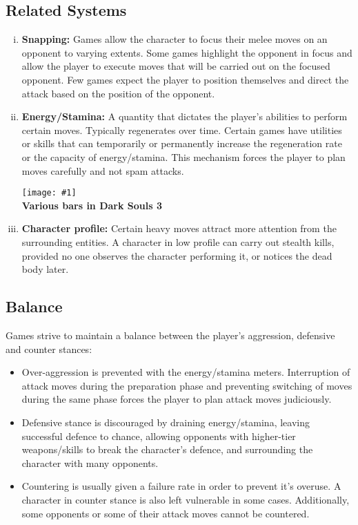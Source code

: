 \documentclass[12pt]{article}
\newcommand{\point}[1]{\item \textbf{#1:}}
\newcommand{\fig}[3]{\begin{center} \texttt{[image: \#1]}\\ \textbf{#3} \end{center}}
\begin{document}
\subsection{Related Systems}

\begin{enumerate}[i.]

\point{Snapping} Games allow the character to focus their melee moves on an opponent to varying extents. Some games highlight the opponent in focus and allow the player to execute moves that will be carried out on the focused opponent. Few games expect the player to position themselves and direct the attack based on the position of the opponent.

\point{Energy/Stamina} A quantity that dictates the player's abilities to perform certain moves. Typically regenerates over time. Certain games have utilities or skills that can temporarily or permanently increase the regeneration rate or the capacity of energy/stamina. This mechanism forces the player to plan moves carefully and not spam attacks.

\fig{dark_souls_bars.jpg}{0.4}{Various bars in Dark Souls 3}

\point{Character profile} Certain heavy moves attract more attention from the surrounding entities. A character in low profile can carry out stealth kills, provided no one observes the character performing it, or notices the dead body later.

\end{enumerate}

\subsection{Balance}

Games strive to maintain a balance between the player's aggression, defensive and counter stances:

\begin{itemize}

\item Over-aggression is prevented with the energy/stamina meters. Interruption of attack moves during the preparation phase and preventing switching of moves during the same phase forces the player to plan attack moves judiciously.

\item Defensive stance is discouraged by draining energy/stamina, leaving successful defence to chance, allowing opponents with higher-tier weapons/skills to break the character's defence, and surrounding the character with many opponents.

\item Countering is usually given a failure rate in order to prevent it's overuse. A character in counter stance is also left vulnerable in some cases. Additionally, some opponents or some of their attack moves cannot be countered.

\end{itemize}
\end{document}

